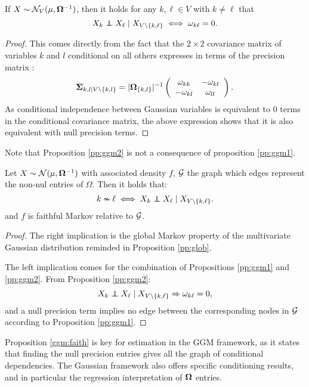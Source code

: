  \begin{prop}\label{pp:ggm2}If  $X\sim \mathcal{N}_V(\mu, {\boldsymbol{\Omega}}^{-1})$, then it holds for any $k,\ell\in V$ with $k\neq \ell$ that
$$X_k \independent X_\ell \mid X_{V\setminus\{k,\ell\}} \iff \omega_{k\ell}=0. $$
 \end{prop}
  \begin{proof}
  This comes directly from the fact that the $2\times 2$  covariance matrix of variables $k$ and $l$ conditional on all others expresses in terms of the precision matrix : $${\boldsymbol{\Sigma}}_{k,l\mid V\setminus\{k,l\}} = |{\boldsymbol{\Omega}}_{\{k,l\}}|^{-1} \left(\begin{array}{cc}
\omega_{kk} & -\omega_{kl}\\
-\omega_{kl} & \omega_{ll}  
  \end{array}\right).$$
  As conditional independence between Gaussian variables is equivalent to 0 terms in the conditional covariance matrix, the above expression shows that it is also equivalent with null precision terms.
  \end{proof}
  Note that Proposition \ref{pp:ggm2} is not a consequence of proposition \ref{pp:ggm1}.
\begin{prop}\label{ggm:faith}
 Let $X\sim \mathcal{N}(\mu, {\boldsymbol{\Omega}}^{-1})$ with associated density $f$, $\mathcal{G}$ the graph which edges represent the non-nul entries of $\Omega$. Then  it holds that:
 $$k\nsim \ell \iff  X_k \independent X_\ell \mid X_{V\setminus\{k,\ell\}}. $$
 and $f$ is faithful Markov relative to $\mathcal{G}$.
\end{prop} 
\begin{proof}
The right implication is the global Markov property of the multivariate Gaussian distribution reminded in Proposition \ref{pp:glob}.

The left implication comes for the combination of Propositions \ref{pp:ggm1} and \ref{pp:ggm2}. From Proposition \ref{pp:ggm2}:
$$X_k \independent X_\ell \mid X_{V\setminus\{k,\ell\}} \Rightarrow \omega_{k\ell}=0,$$
and a null precision term implies no edge between the corresponding nodes in $\mathcal{G}$ according to  Proposition \ref{pp:ggm1}.
\end{proof}
Proposition \ref{ggm:faith} is key for estimation in the GGM framework, as it states that finding the null precision entries gives all the graph of conditional dependencies. The Gaussian framework also offers specific conditioning results, and in particular the regression interpretation of ${\boldsymbol{\Omega}}$ entries.

